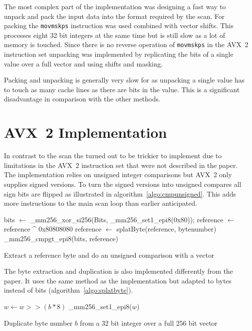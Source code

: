 The most complex part of the implementation was designing a fast way to unpack
and pack the input data into the format required by the \bwv{} scan. For packing
the \texttt{movmskps} instruction was used combined with vector shifts. This
processes eight 32 bit integers at the same time but is still slow as a lot of
memory is touched. Since there is no reverse operation of \texttt{movmskps} in
the AVX~2 instruction set unpacking was implemented by replicating the bits of a
single value over a full vector and using shifts and masking.

Packing and unpacking is generally very slow for \bwv{} as unpacking a single
value has to touch as many cache lines as there are bits in the value. This is a
significant disadvantage in comparison with the other methods.

\section{AVX~2 \bs{} Implementation}

In contrast to the \bwv{} scan the \bs{} turned out to be trickier to implement
due to limitations in the AVX~2 instruction set that were not described in the
\bs{} paper. The implementation relies on unsigned integer comparisons but AVX~2
only supplies signed versions. To turn the signed versions into unsigned
compares all sign bits are flipped as illustrated in
algorithm~\ref{algo:cmpunsigned}. This adds more instructions to the main scan
loop than earlier anticipated.

\begin{algorithm}[h]
\begin{algorithmic}[1]
  \State bits $\gets$ \_mm256\_xor\_si256(Bits, \_mm256\_set1\_epi8(0x80));
  \State reference $\gets$ reference \^{} 0x80808080
  \State reference $\gets$ splatByte(reference, bytenumber)
  \State \Return \_mm256\_cmpgt\_epi8(bits, reference)
  \EndProcedure
\end{algorithmic}
\caption{Extract a reference byte and do an unsigned comparison with a vector}
\label{algo:cmpunsigned}
\end{algorithm}

The byte extraction and duplication is also implemented differently from the
paper. It uses the same method as the \bwv{} implementation but adapted to bytes
instead of bits (algorithm~\ref{algo:splatbyte}).

\begin{algorithm}[h]
\begin{algorithmic}[1]
  \State $w \gets w >> (b * 8)$ 
  \State \Return \_mm256\_set1\_epi8($w$) 
  \EndProcedure
\end{algorithmic}
\caption{Duplicate byte number $b$ from a 32 bit integer over a full 256 bit vector}
\label{algo:splatbyte}
\end{algorithm}

